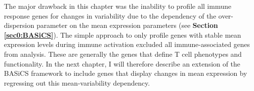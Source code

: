 The major drawback in this chapter was the inability to profile all immune response genes for changes in variability due to the dependency of the over-dispersion parameter on the mean expression parameters (see \textbf{Section \ref{sec0:BASiCS}}). The simple approach to only profile genes with stable mean expression levels during immune activation excluded all immune-associated genes from analysis. These are generally the genes that define T cell phenotypes and functionality. In the next chapter, I will therefore describe an extension of the BASiCS framework to include genes that display changes in mean expression by regressing out this mean-variability dependency.





